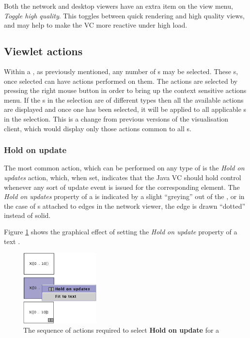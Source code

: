 Both the network and desktop viewers have an extra item on the view
menu, \emph{Toggle high quality}.  This toggles between quick
rendering and high quality views, and may help to make the VC more
reactive under high load.

\subsection{Viewlet actions}

Within a \viewer{}, as previously mentioned, any number of \viewlet{}s
may be selected.  These \viewlet{}s, once selected can have actions
performed on them.  The actions are selected by pressing the right
mouse button in order to bring up the context sensitive actions menu.
If the \viewlet{}s in the selection are of different types then all
the available actions are displayed and once one has been selected, it
will be applied to all applicable \viewlet{}s in the selection.  This
is a change from previous versions of the visualisation client, which
would display only those actions common to all \viewlet{}s.

\subsubsection{Hold on update}
The most common action, which can be performed on any type of
\viewlet{} is the \emph{Hold on updates} action, which, when set,
indicates that the Java VC should hold control whenever any sort of
update event is issued for the corresponding \viewable{} element.  The
\emph{Hold on updates} property of a \viewlet{} is indicated by a
slight ``greying'' out of the \viewlet{}, or in the case of
\viewlet{}s attached to edges in the network viewer, the edge is drawn
``dotted'' instead of solid.

Figure \ref{fig:viewlethold} shows the graphical effect of setting the
\emph{Hold on update} property of a text \viewlet.

\begin{figure}[htsp]
\centering
\includegraphics[width=4cm]{vcviewlethold}
\caption{The sequence of actions required to select \textbf{Hold on update} for a \viewlet{}}
\label{fig:viewlethold}
\end{figure}

